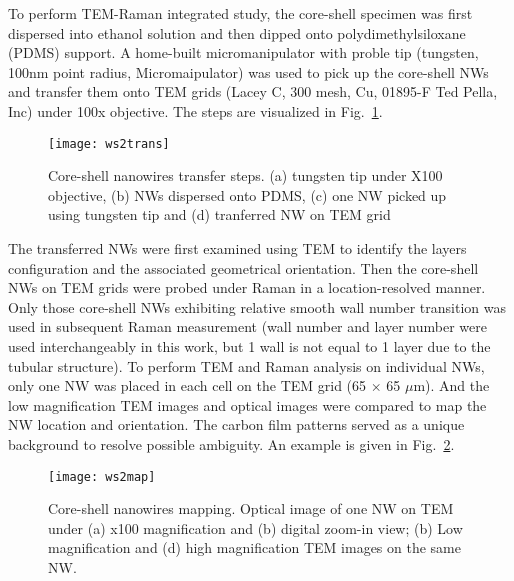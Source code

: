 To perform TEM-Raman integrated study, the core-shell specimen was first dispersed into ethanol solution and then dipped onto polydimethylsiloxane (PDMS) support. A home-built micromanipulator with proble tip (tungsten, 100nm point radius, Micromaipulator) was used to pick up the core-shell NWs and transfer them onto TEM grids (Lacey C, 300 mesh, Cu, 01895-F Ted Pella, Inc) under 100x objective. The steps are visualized in Fig.~\ref{fig:ch5ws2trans}. 
\begin{figure}[htb]
\centering
\texttt{[image: ws2trans]}
\caption[Manipulating core-shell NWs]{Core-shell nanowires transfer steps. (a) tungsten tip under X100 objective, (b) NWs dispersed onto PDMS, (c) one NW picked up using tungsten tip and (d) tranferred NW on TEM grid}
\label{fig:ch5ws2trans}
\end{figure}

The transferred NWs were first examined using TEM to identify the  layers configuration and the associated geometrical orientation. Then the core-shell NWs on TEM grids were probed under Raman in a location-resolved manner. Only those core-shell NWs exhibiting relative smooth  wall number transition was used in subsequent Raman measurement (wall number and layer number were used interchangeably in this work, but 1 wall is not equal to 1 layer due to the tubular structure). To perform TEM and Raman analysis on individual NWs, only one NW was placed in each cell on the TEM grid (65 $\times$ 65 $\mu$m). And the low magnification TEM images and optical images were compared to map the NW location and orientation. The carbon film patterns served as a unique background to resolve possible ambiguity. An example is given in Fig.~\ref{fig:ch5ws2map}. 
\begin{figure}[htb]
\centering
\texttt{[image: ws2map]}
\caption[Mapping core-shell NWs]{Core-shell nanowires mapping.  Optical image of one NW on TEM under (a) x100 magnification and (b) digital zoom-in view; (b) Low magnification and (d) high magnification TEM images on the same NW.}
\label{fig:ch5ws2map}
\end{figure}

